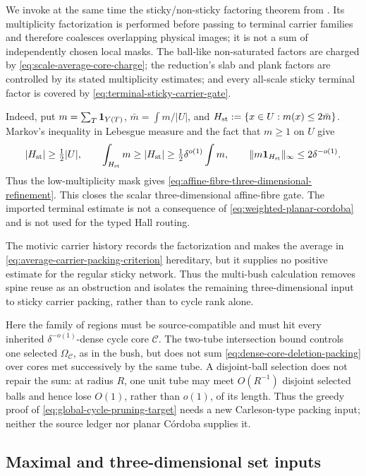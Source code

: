 \documentclass[11pt]{article}
\begin{document}
We invoke at the same time the sticky/non-sticky factoring theorem from
\cite{GuthWangZahl3D}.  Its multiplicity factorization is performed before
passing to terminal carrier families and therefore coalesces overlapping
physical images; it is not a sum of independently chosen local masks.  The
ball-like non-saturated factors are charged by
\eqref{eq:scale-average-core-charge}; the reduction's slab and plank factors
are controlled by its stated multiplicity estimates; and every all-scale
sticky terminal factor is covered by
\eqref{eq:terminal-sticky-carrier-gate}.

Indeed, put \(m=\sum_T{\bf1}_{Y(T)}\),
\(\bar m=\int m/|U|\), and
\(H_{\rm st}:=\{x\in U:m(x)\le2\bar m\}\).  Markov's inequality in Lebesgue measure and
the fact that \(m\ge1\) on \(U\) give
\[
 |H_{\rm st}|\ge\tfrac12|U|,
 \qquad
 \int_{H_{\rm st}}m\ge|H_{\rm st}|
 \ge\tfrac12\delta^{o(1)}\int m,
 \qquad
 \|m{\bf1}_{H_{\rm st}}\|_\infty\le2\delta^{-o(1)}.
\]
Thus the low-multiplicity mask gives
\eqref{eq:affine-fibre-three-dimensional-refinement}.  This closes the scalar
three-dimensional affine-fibre gate.  The imported terminal estimate is not a
consequence of \eqref{eq:weighted-planar-cordoba} and is not used for the typed
Hall routing.

The motivic carrier history records the
factorization and makes the average in
\eqref{eq:average-carrier-packing-criterion} hereditary, but it supplies no
positive estimate for the regular sticky network.  Thus the multi-bush
calculation removes spine reuse as an obstruction and isolates the remaining
three-dimensional input to sticky carrier packing, rather than to cycle rank
alone.

Here the family of regions must be source-compatible and must hit every inherited
\(\delta^{-o(1)}\)-dense cycle core \(\mathcal C\).  The two-tube intersection
bound controls one selected \(\Omega_{\mathcal C}\), as in the bush, but does
not sum \eqref{eq:dense-core-deletion-packing} over cores met successively by
the same tube.  A disjoint-ball selection does not repair the sum: at radius
\(R\), one unit tube may meet \(O(R^{-1})\) disjoint selected balls and hence
lose \(O(1)\), rather than \(o(1)\), of its length.  Thus the greedy proof of
\eqref{eq:global-cycle-pruning-target} needs a new Carleson-type packing input;
neither the source ledger nor planar C\'ordoba supplies it.

\subsection{Maximal and three-dimensional set inputs}
\end{document}
